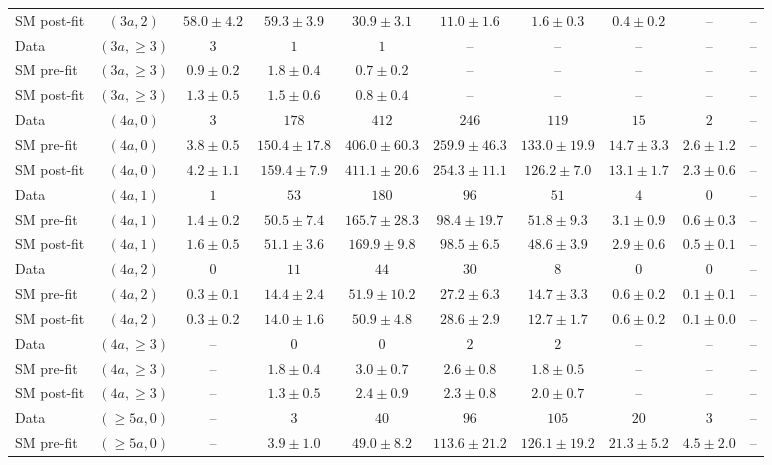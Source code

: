 \begin{table}[h!]
{\begin{tabular}{lccccccccc}
 SM post-fit & $(3a,2)$ & $58.0\pm4.2$ & $59.3\pm3.9$ & $30.9\pm3.1$ & $11.0\pm1.6$ & $1.6\pm0.3$ & $0.4\pm0.2$ & -- & -- \\[0.5ex]
 Data & $(3a,\geq 3)$ & $3$ & $1$ & $1$ & -- & -- & -- & -- & -- \\[0.5ex]
 SM pre-fit & $(3a,\geq 3)$ & $0.9\pm0.2$ & $1.8\pm0.4$ & $0.7\pm0.2$ & -- & -- & -- & -- & -- \\[0.5ex]
 SM post-fit & $(3a,\geq 3)$ & $1.3\pm0.5$ & $1.5\pm0.6$ & $0.8\pm0.4$ & -- & -- & -- & -- & -- \\[0.5ex]
 Data & $(4a,0)$ & $3$ & $178$ & $412$ & $246$ & $119$ & $15$ & $2$ & -- \\[0.5ex]
 SM pre-fit & $(4a,0)$ & $3.8\pm0.5$ & $150.4\pm17.8$ & $406.0\pm60.3$ & $259.9\pm46.3$ & $133.0\pm19.9$ & $14.7\pm3.3$ & $2.6\pm1.2$ & -- \\[0.5ex]
 SM post-fit & $(4a,0)$ & $4.2\pm1.1$ & $159.4\pm7.9$ & $411.1\pm20.6$ & $254.3\pm11.1$ & $126.2\pm7.0$ & $13.1\pm1.7$ & $2.3\pm0.6$ & -- \\[0.5ex]
 Data & $(4a,1)$ & $1$ & $53$ & $180$ & $96$ & $51$ & $4$ & $0$ & -- \\[0.5ex]
 SM pre-fit & $(4a,1)$ & $1.4\pm0.2$ & $50.5\pm7.4$ & $165.7\pm28.3$ & $98.4\pm19.7$ & $51.8\pm9.3$ & $3.1\pm0.9$ & $0.6\pm0.3$ & -- \\[0.5ex]
 SM post-fit & $(4a,1)$ & $1.6\pm0.5$ & $51.1\pm3.6$ & $169.9\pm9.8$ & $98.5\pm6.5$ & $48.6\pm3.9$ & $2.9\pm0.6$ & $0.5\pm0.1$ & -- \\[0.5ex]
 Data & $(4a,2)$ & $0$ & $11$ & $44$ & $30$ & $8$ & $0$ & $0$ & -- \\[0.5ex]
 SM pre-fit & $(4a,2)$ & $0.3\pm0.1$ & $14.4\pm2.4$ & $51.9\pm10.2$ & $27.2\pm6.3$ & $14.7\pm3.3$ & $0.6\pm0.2$ & $0.1\pm0.1$ & -- \\[0.5ex]
 SM post-fit & $(4a,2)$ & $0.3\pm0.2$ & $14.0\pm1.6$ & $50.9\pm4.8$ & $28.6\pm2.9$ & $12.7\pm1.7$ & $0.6\pm0.2$ & $0.1\pm0.0$ & -- \\[0.5ex]
 Data & $(4a,\geq 3)$ & -- & $0$ & $0$ & $2$ & $2$ & -- & -- & -- \\[0.5ex]
 SM pre-fit & $(4a,\geq 3)$ & -- & $1.8\pm0.4$ & $3.0\pm0.7$ & $2.6\pm0.8$ & $1.8\pm0.5$ & -- & -- & -- \\[0.5ex]
 SM post-fit & $(4a,\geq 3)$ & -- & $1.3\pm0.5$ & $2.4\pm0.9$ & $2.3\pm0.8$ & $2.0\pm0.7$ & -- & -- & -- \\[0.5ex]
 Data & $(\geq 5a,0)$ & -- & $3$ & $40$ & $96$ & $105$ & $20$ & $3$ & -- \\[0.5ex]
 SM pre-fit & $(\geq 5a,0)$ & -- & $3.9\pm1.0$ & $49.0\pm8.2$ & $113.6\pm21.2$ & $126.1\pm19.2$ & $21.3\pm5.2$ & $4.5\pm2.0$ & -- \\[0.5ex]

\end{tabular}}
\end{table}
